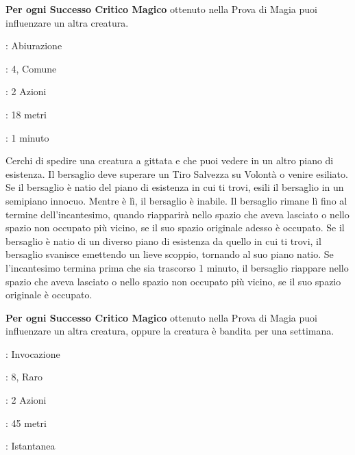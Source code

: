 \begin{multicols}{2}
\textbf{Per ogni Successo Critico Magico} ottenuto nella Prova di Magia puoi influenzare un altra creatura.

\noindent\colorbox{OBSSgold!10}{
\begin{minipage}{0.95\linewidth}
\begin{description}[noitemsep, topsep=0pt, parsep=0pt, partopsep=0pt, leftmargin=0cm, labelwidth=1.3cm]
	\item[\textbf{Lista}]: Abiurazione
	\item[\textbf{Livello}]: 4, Comune
	\item[\textbf{Lancio}]: 2 Azioni
	\item[\textbf{Gittata}]: 18 metri
	\item[\textbf{Durata}]: 1 minuto
\end{description}
\end{minipage}}\smallskip

Cerchi di spedire una creatura a gittata e che puoi vedere in un altro piano di esistenza. Il bersaglio deve superare un Tiro Salvezza su Volontà o venire esiliato. Se il bersaglio è natio del piano di esistenza in cui ti trovi, esili il bersaglio in un semipiano innocuo. Mentre è lì, il bersaglio è inabile. Il bersaglio rimane lì fino al termine dell'incantesimo, quando riapparirà nello spazio che aveva lasciato o nello spazio non occupato più vicino, se il suo spazio originale adesso è occupato. Se il bersaglio è natio di un diverso piano di esistenza da quello in cui ti trovi, il bersaglio svanisce emettendo un lieve scoppio, tornando al suo piano natio. Se l'incantesimo termina prima che sia trascorso 1 minuto, il bersaglio riappare nello spazio che aveva lasciato o nello spazio non occupato più vicino, se il suo spazio originale è occupato.

\textbf{Per ogni Successo Critico Magico} ottenuto nella Prova di Magia puoi influenzare un altra creatura, oppure la creatura è bandita per una settimana.

\noindent\colorbox{OBSSgold!10}{
\begin{minipage}{0.95\linewidth}
\begin{description}[noitemsep, topsep=0pt, parsep=0pt, partopsep=0pt, leftmargin=0cm, labelwidth=1.3cm]
	\item[\textbf{Lista}]: Invocazione
	\item[\textbf{Livello}]: 8, Raro
	\item[\textbf{Lancio}]: 2 Azioni
	\item[\textbf{Gittata}]: 45 metri
	\item[\textbf{Durata}]: Istantanea
\end{description}
\end{minipage}}\smallskip


\end{multicols}
